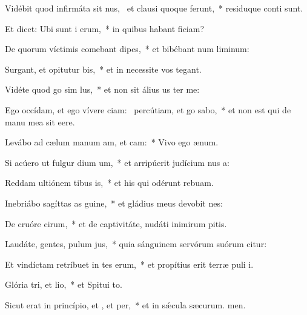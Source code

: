 \item Vidébit quod infirmáta sit nus,~\pscross{} et clausi quoque ferunt,~* residuque conti sunt.
\item Et dicet: Ubi sunt i erum,~* in quibus habant ficiam?
\item De quorum víctimis comebant dipes,~* et bibébant num liminum:
\item Surgant, et opitutur bis,~* et in necessite vos tegant.
\item Vidéte quod go sim lus,~* et non sit álius us ter me:
\item Ego occídam, et ego vívere ciam:~\pscross{} percútiam, et go sabo,~* et non est qui de manu mea sit eere.
\item Levábo ad cælum manum am, et cam:~* Vivo ego  ænum.
\item Si acúero ut fulgur dium um,~* et arripúerit judícium nus a:
\item Reddam ultiónem tibus is,~* et his qui odérunt  rebuam.
\item Inebriábo sagíttas as guine,~* et gládius meus devobit nes:
\item De cruóre cirum,~* et de captivitáte, nudáti inimirum pitis.
\item Laudáte, gentes, pulum jus,~* quia sánguinem servórum suórum citur:
\item Et vindíctam retríbuet in tes erum,~* et propítius erit terræ puli i.
\item \singlecolsep
\item Glória tri, et lio,~* et Spitui to.
\item Sicut erat in princípio, et , et per,~* et in sǽcula sæcurum. men.

